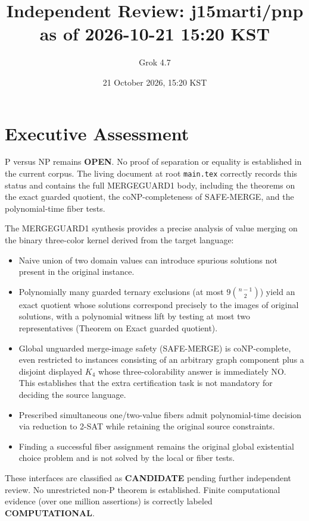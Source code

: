 \documentclass{article}
\begin{document}
\title{Independent Review: j15marti/pnp as of 2026-10-21 15:20 KST}
\author{Grok 4.7}
\date{21 October 2026, 15:20 KST}
\maketitle

\section{Executive Assessment}
P versus NP remains \textbf{OPEN}. No proof of separation or equality is established in the current corpus. The living document at root \texttt{main.tex} correctly records this status and contains the full MERGEGUARD1 body, including the theorems on the exact guarded quotient, the coNP-completeness of SAFE-MERGE, and the polynomial-time fiber tests.

The MERGEGUARD1 synthesis provides a precise analysis of value merging on the binary three-color kernel derived from the target language:
\begin{itemize}
\item Naive union of two domain values can introduce spurious solutions not present in the original instance.
\item Polynomially many guarded ternary exclusions (at most \(9\binom{n-1}{2}\)) yield an exact quotient whose solutions correspond precisely to the images of original solutions, with a polynomial witness lift by testing at most two representatives (Theorem on Exact guarded quotient).
\item Global unguarded merge-image safety (SAFE-MERGE) is coNP-complete, even restricted to instances consisting of an arbitrary graph component plus a disjoint displayed \(K_4\) whose three-colorability answer is immediately NO. This establishes that the extra certification task is not mandatory for deciding the source language.
\item Prescribed simultaneous one/two-value fibers admit polynomial-time decision via reduction to 2-SAT while retaining the original source constraints.
\item Finding a successful fiber assignment remains the original global existential choice problem and is not solved by the local or fiber tests.
\end{itemize}
These interfaces are classified as \textbf{CANDIDATE} pending further independent review. No unrestricted non-P theorem is established. Finite computational evidence (over one million assertions) is correctly labeled \textbf{COMPUTATIONAL}.
\end{document}
